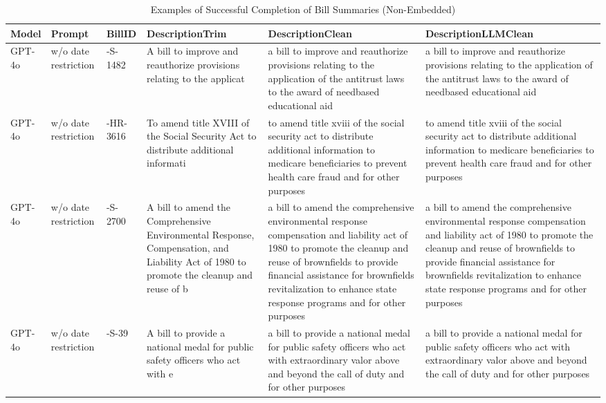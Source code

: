 \begin{table}[!h]
\centering
\caption{Examples of Successful Completion of Bill Summaries (Non-Embedded)}
\centering
\begin{tabular}[t]{>{\raggedright\arraybackslash}p{1.4cm}>{\raggedright\arraybackslash}p{1.4cm}>{\raggedright\arraybackslash}p{1.4cm}>{\raggedright\arraybackslash}p{3.2cm}>{\raggedright\arraybackslash}p{3.2cm}>{\raggedright\arraybackslash}p{3.2cm}}
\toprule
Model & Prompt & BillID & DescriptionTrim & DescriptionClean & DescriptionLLMClean\\
\midrule
GPT-4o & w/o date restriction & 114-S-1482 & A bill to improve and reauthorize provisions relating to the applicat & a bill to improve and reauthorize provisions relating to the application of the antitrust laws to the award of needbased educational aid & a bill to improve and reauthorize provisions relating to the application of the antitrust laws to the award of needbased educational aid\\
\midrule
GPT-4o & w/o date restriction & 113-HR-3616 & To amend title XVIII of the Social Security Act to distribute additional informati & to amend title xviii of the social security act to distribute additional information to medicare beneficiaries to prevent health care fraud and for other purposes & to amend title xviii of the social security act to distribute additional information to medicare beneficiaries to prevent health care fraud and for other purposes\\
\midrule
GPT-4o & w/o date restriction & 106-S-2700 & A bill to amend the Comprehensive Environmental Response, Compensation, and Liability Act of 1980 to promote the cleanup and reuse of b & a bill to amend the comprehensive environmental response compensation and liability act of 1980 to promote the cleanup and reuse of brownfields to provide financial assistance for brownfields revitalization to enhance state response programs and for other purposes & a bill to amend the comprehensive environmental response compensation and liability act of 1980 to promote the cleanup and reuse of brownfields to provide financial assistance for brownfields revitalization to enhance state response programs and for other purposes\\
\midrule
GPT-4o & w/o date restriction & 107-S-39 & A bill to provide a national medal for public safety officers who act with e & a bill to provide a national medal for public safety officers who act with extraordinary valor above and beyond the call of duty and for other purposes & a bill to provide a national medal for public safety officers who act with extraordinary valor above and beyond the call of duty and for other purposes\\

\end{tabular}
\end{table}
